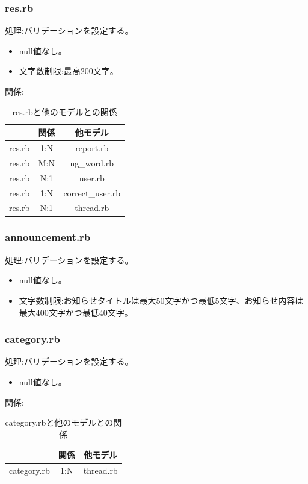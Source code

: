 \documentclass[a4j]{jarticle}
\begin{document}
\subsubsection{res.rb}
\noindent
処理:バリデーションを設定する。
\begin{itemize}
  \item null値なし。
  \item 文字数制限:最高200文字。
\end{itemize}
関係:
\begin{table}[H]
  \centering
  \caption{res.rbと他のモデルとの関係}
  \begin{tabular}{|c|c|c|}\hline
    & 関係 & 他モデル\\ \hline \hline
    res.rb & 1:N & report.rb \\ \hline
    res.rb & M:N & ng\_word.rb \\ \hline
    res.rb & N:1 & user.rb \\ \hline
    res.rb & 1:N & correct\_user.rb \\ \hline
    res.rb & N:1 & thread.rb \\ \hline
  \end{tabular}
\end{table}


\subsubsection{announcement.rb}
\noindent
処理:バリデーションを設定する。
\begin{itemize}
  \item null値なし。
  \item 文字数制限:お知らせタイトルは最大50文字かつ最低5文字、お知らせ内容は最大400文字かつ最低40文字。
\end{itemize}

\subsubsection{category.rb}
\noindent
処理:バリデーションを設定する。
\begin{itemize}
  \item null値なし。
\end{itemize}
関係:
\begin{table}[H]
  \centering
  \caption{category.rbと他のモデルとの関係}
  \begin{tabular}{|c|c|c|}\hline
    & 関係 & 他モデル\\ \hline \hline
    category.rb & 1:N & thread.rb \\ \hline
  \end{tabular}
\end{table}
\end{document}
